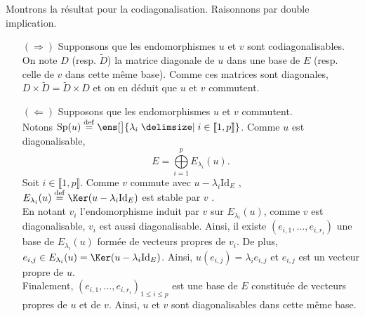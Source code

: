 \begin{demo} 
    Montrons la résultat pour la codiagonalisation. Raisonnons par double implication.
    \begin{itemize}
        \item[$(\Rightarrow)$] Supponsons que les endomorphismes $u$ et $v$ sont codiagonalisables. On note $D$ (resp. $\widetilde{D}$) la matrice diagonale de $u$ dans une base de $E$ (resp. celle de $v$ dans cette même base). Comme ces matrices sont diagonales, $D \times \widetilde{D} = \widetilde{D} \times D$ \note {} et on en déduit que $u$ et $v$ commutent.
        \item[$(\Leftarrow)$] Supposons que les endomorphismes $u$ et $v$ commutent. \\ 
        Notons $\mathrm{Sp}(u) \defeq \ens[\big]{ \lambda_i \tq i \in \llbracket1, p \rrbracket }$. Comme $u$ est diagonalisable, 
        $$E = \bigoplus\limits_{i = 1}^{p} E_{\lambda_i}(u).$$
        Soit $i \in \llbracket 1, p \rrbracket$. Comme $v$ commute avec $u - \lambda_i \mathrm{Id}_E$ \note 
        , $E_{\lambda_i}(u) \defeq \Ker(u - \lambda_i \Id_E)$ est stable par $v$ \note. \\
        En notant $v_i$ l'endomorphisme induit par $v$ sur $E_{\lambda_i}(u)$, comme $v$ est diagonalisable, $v_i$ est aussi diagonalisable. Ainsi, il existe $(e_{i, 1}, \dots, e_{i, r_i})$ une base de $E_{\lambda_i}(u)$ formée de vecteurs propres de $v_i$. De plus, $e_{i, j} \in E_{\lambda_i}(u) = \Ker(u - \lambda_i \Id_E)$. Ainsi, $u(e_{i,j}) = \lambda_i e_{i,j}$ et $e_{i,j}$ est un vecteur propre de $u$. \\
        Finalement, $(e_{i, 1}, \dots, e_{i, r_i})_{1 \leqslant i \leqslant p}$ est une base de $E$ constituée de vecteurs propres de $u$ et de $v$. Ainsi, $u$ et $v$ sont diagonalisables dans cette même base. 
    \end{itemize}
\end{demo}

